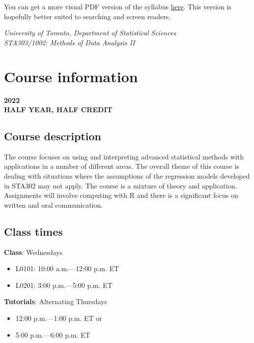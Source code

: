\documentclass[
  openany]{book}
\providecommand{\tightlist}{%
  \setlength{\itemsep}{0pt}\setlength{\parskip}{0pt}}
\begin{document}
You can get a more visual PDF version of the syllabus \href{https://sta303-bolton.github.io/sta303-w22-courseguide/other-files/STA303-1002_W22_syllabus.pdf}{here}. This version is hopefully better suited to searching and screen readers.

\emph{University of Toronto, Department of Statistical Sciences}\\
\emph{STA303/1002: Methods of Data Analysis II}

\hypertarget{course-information}{%
\section{Course information}\label{course-information}}

\textbf{2022}\\
\textbf{HALF YEAR, HALF CREDIT}

\hypertarget{course-description}{%
\subsection{Course description}\label{course-description}}

The course focuses on using and interpreting advanced statistical methods with applications in a number of different areas. The overall theme of this course is dealing with situations where the assumptions of the regression models developed in STA302 may not apply. The course is a mixture of theory and application. Assignments will involve computing with R and there is a significant focus on written and oral communication.

\hypertarget{class-times}{%
\subsection{Class times}\label{class-times}}

\textbf{Class}: Wednesdays

\begin{itemize}
\tightlist
\item
  L0101: 10:00 a.m.---12:00 p.m. ET
\item
  L0201: 3:00 p.m.---5:00 p.m. ET
\end{itemize}

\textbf{Tutorials}: Alternating Thursdays

\begin{itemize}
\tightlist
\item
  12:00 p.m.---1:00 p.m. ET or
\item
  5:00 p.m.---6:00 p.m. ET
\end{itemize}
\end{document}
